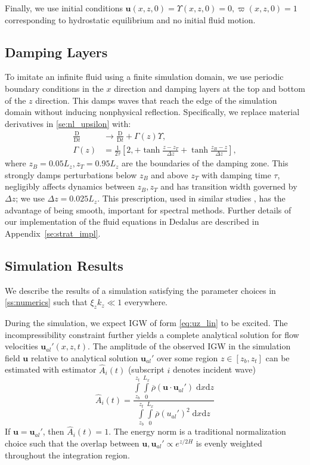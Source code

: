 \documentclass[
        fleqn,
        usenatbib,
    ]{mnras}
\newcommand*{\md}[2]{\frac{\mathrm{D}#1}{\mathrm{D}#2}}
\newcommand*{\p}[1]{\left(#1\right)}
\newcommand*{\s}[1]{\left[#1\right]}
\newcommand*{\bm}[1]{\boldsymbol{\mathbf{#1}}}
\begin{document}
Finally, we use initial conditions $\bm{u}(x, z, 0) = \Upsilon(x, z, 0) = 0,
\varpi(x, z, 0) = 1$ corresponding to hydrostatic equilibrium and no initial
fluid motion.

\subsection{Damping Layers}\label{ss:damping}

To imitate an infinite fluid using a finite simulation domain, we use periodic
boundary conditions in the $x$ direction and damping layers at the top and
bottom of the $z$ direction. This damps waves that reach the edge of the
simulation domain without inducing nonphysical reflection. Specifically, we
replace material derivatives in \autoref{se:nl_upsilon} with:
\begin{align}
    \md{}{t} &\to \md{}{t} + \Gamma(z)\Upsilon,\nonumber\\
    \Gamma(z) &= \frac{1}{2\tau}\s{2,+ \tanh \frac{z - z_T}{\Delta z}
        + \tanh \frac{z_B - z}{\Delta z}},\label{eq:Gamma}
\end{align}
where $z_B = 0.05L_z, z_T = 0.95L_z$ are the boundaries of the damping zone.
This strongly damps perturbations below $z_B$ and above $z_T$ with damping time
$\tau$, negligibly affects dynamics between $z_B, z_T$ and has transition width
governed by $\Delta z$; we use $\Delta z = 0.025L_z$. This prescription, used in
similar studies \citep{lecoanet_damp}, has the advantage of being smooth,
important for spectral methods. Further details of our implementation of the
fluid equations in Dedalus are described in Appendix~\ref{se:strat_impl}.

\subsection{Simulation Results}\label{ss:lin_ns}

We describe the results of a simulation satisfying the parameter choices in
\autoref{ss:numerics} such that $\xi_z k_z \ll 1$ everywhere.

During the simulation, we expect IGW of form \autoref{eq:uz_lin} to be excited.
The incompressibility constraint further yields a complete analytical solution
for flow velocities $\bm{u}_{al}'(x, z, t)$. The amplitude of the observed IGW
in the simulation field $\bm{u}$ relative to analytical solution $\bm{u}_{al}'$
over some region $z \in [z_b, z_t]$ can be estimated with estimator
$\hat{A}_i(t)$ (subscript $i$ denotes incident wave)
\begin{equation}
    \hat{A}_i(t) = \frac{\int\limits_{z_b}^{z_t}\int\limits_0^{L_x}
        \overline{\rho}\p{\bm{u} \cdot \bm{u}_{al}'}\;\mathrm{d}x\mathrm{d}z}
        {\int\limits_{z_b}^{z_t}\int\limits_0^{L_x}
        \overline{\rho}(u_{al}')^2\;\mathrm{d}x\mathrm{d}z}
        \label{eq:ahat_def}
\end{equation}
If $\bm{u} = \bm{u}_{al}'$, then $\hat{A}_i(t) = 1$. The energy norm is a
traditional normalization choice such that the overlap between $\bm{u},
\bm{u}_{al}' \propto e^{z/2H}$ is evenly weighted throughout the integration
region.
\end{document}
